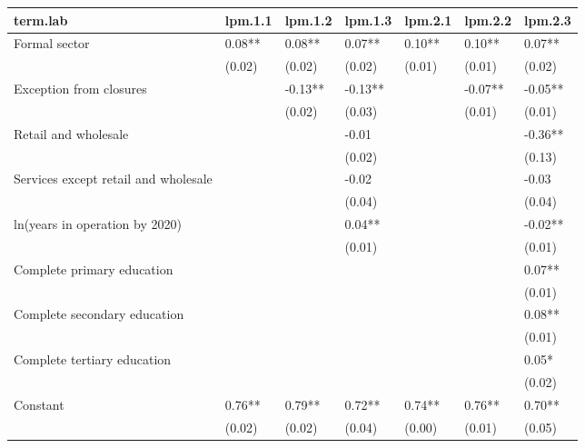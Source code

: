 \begin{table}[ht]
\centering
\begin{tabular}{lllllll}
  \hline
term.lab & lpm.1.1 & lpm.1.2 & lpm.1.3 & lpm.2.1 & lpm.2.2 & lpm.2.3 \\ 
  \hline
Formal sector & 0.08** & 0.08** & 0.07** & 0.10** & 0.10** & 0.07** \\ 
   & (0.02) & (0.02) & (0.02) & (0.01) & (0.01) & (0.02) \\ 
  Exception from closures &  & -0.13** & -0.13** &  & -0.07** & -0.05** \\ 
   &  & (0.02) & (0.03) &  & (0.01) & (0.01) \\ 
  Retail and wholesale &  &  & -0.01 &  &  & -0.36** \\ 
   &  &  & (0.02) &  &  & (0.13) \\ 
  Services except retail and wholesale &  &  & -0.02 &  &  & -0.03 \\ 
   &  &  & (0.04) &  &  & (0.04) \\ 
  ln(years in operation by 2020) &  &  & 0.04** &  &  & -0.02** \\ 
   &  &  & (0.01) &  &  & (0.01) \\ 
  Complete primary education &  &  &  &  &  & 0.07** \\ 
   &  &  &  &  &  & (0.01) \\ 
  Complete secondary education &  &  &  &  &  & 0.08** \\ 
   &  &  &  &  &  & (0.01) \\ 
  Complete tertiary education &  &  &  &  &  & 0.05* \\ 
   &  &  &  &  &  & (0.02) \\ 
  Constant & 0.76** & 0.79** & 0.72** & 0.74** & 0.76** & 0.70** \\ 
   & (0.02) & (0.02) & (0.04) & (0.00) & (0.01) & (0.05) \\ 
   \hline
\end{tabular}
\end{table}
